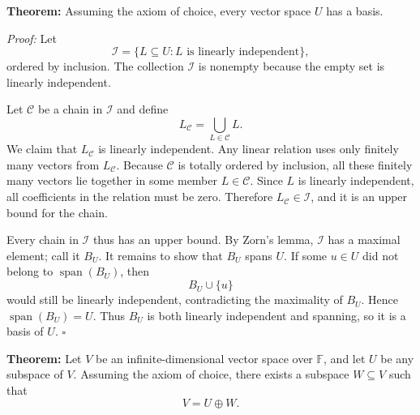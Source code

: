 \documentclass[a4paper,11pt,abstract=true]{scrartcl}
\theoremstyle{dotlessP}
\theoremstyle{dotlessS}
\theoremstyle{remark}
\theoremstyle{definition}
\begin{document}
\begin{problem_box}
\textbf{Theorem:} Assuming the axiom of
choice, every vector space $U$ has a basis.

\end{problem_box}

\begin{claim_box}
\textit{Proof:} Let
\[
\mathcal{I}=\{L\subseteq U:L\text{ is linearly independent}\},
\]
ordered by inclusion. The collection $\mathcal{I}$ is nonempty because the
empty set is linearly independent.

Let $\mathcal{C}$ be a chain in $\mathcal{I}$ and define
\[
L_{\mathcal{C}}=\bigcup_{L\in\mathcal{C}}L.
\]
We claim that $L_{\mathcal{C}}$ is linearly independent. Any linear relation
uses only finitely many vectors from $L_{\mathcal{C}}$. Because
$\mathcal{C}$ is totally ordered by inclusion, all these finitely many
vectors lie together in some member $L\in\mathcal{C}$. Since $L$ is linearly
independent, all coefficients in the relation must be zero. Therefore
$L_{\mathcal{C}}\in\mathcal{I}$, and it is an upper bound for the chain.

Every chain in $\mathcal{I}$ thus has an upper bound. By Zorn's lemma,
$\mathcal{I}$ has a maximal element; call it $B_U$. It remains to show that
$B_U$ spans $U$. If some $u\in U$ did not belong to
$\operatorname{span}(B_U)$, then
\[
B_U\cup\{u\}
\]
would still be linearly independent, contradicting the maximality of $B_U$.
Hence $\operatorname{span}(B_U)=U$. Thus $B_U$ is both linearly independent
and spanning, so it is a basis of $U$. \hfill$\square$
\end{claim_box}

\begin{problem_box}
\textbf{Theorem:} Let
$V$ be an infinite-dimensional vector space over $\mathbb{F}$, and let $U$ be any
subspace of $V$. Assuming the axiom of choice, there exists a subspace
$W\subseteq V$ such that
\[
V=U\oplus W.
\]

\end{problem_box}
\end{document}

